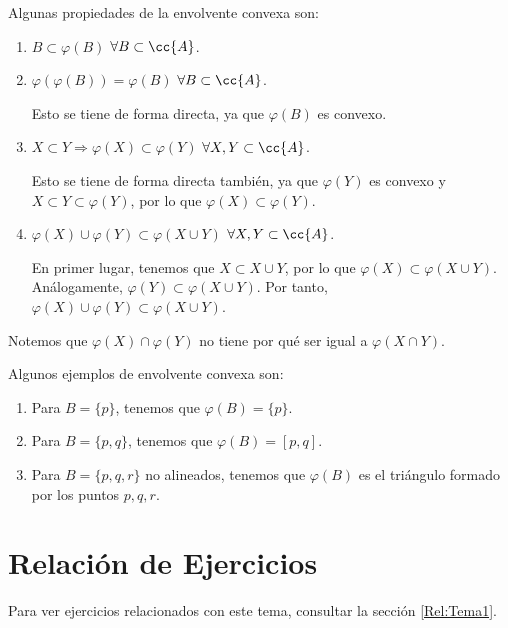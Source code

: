 Algunas propiedades de la envolvente convexa son:
\begin{enumerate}

    \item $B\subset \varphi(B)$ \qquad $\forall B\subset \cc{A}$.
    \item $\varphi(\varphi(B))=\varphi (B)$ \qquad $\forall B\subset \cc{A}$.
    
    Esto se tiene de forma directa, ya que $\varphi(B)$ es convexo.

    \item $X\subset Y \Longrightarrow \varphi(X)\subset \varphi(Y)$ \qquad $\forall X,Y\subset \cc{A}$.
    
    Esto se tiene de forma directa también, ya que $\varphi(Y)$ es convexo y $X\subset Y\subset \varphi(Y)$, por lo que $\varphi(X)\subset \varphi(Y)$.

    \item $\varphi (X)\cup \varphi (Y)\subset \varphi (X\cup Y)$ \qquad $\forall X,Y\subset \cc{A}$.
    
    En primer lugar, tenemos que $X \subset X\cup Y$, por lo que $\varphi(X)\subset \varphi(X\cup Y)$. Análogamente, $\varphi(Y)\subset \varphi(X\cup Y)$. Por tanto, $\varphi(X)\cup \varphi(Y)\subset \varphi(X\cup Y)$.
\end{enumerate}

Notemos que $\varphi(X)\cap \varphi(Y)$ no tiene por qué ser igual a $\varphi(X\cap Y)$.
\begin{ejemplo}
    Algunos ejemplos de envolvente convexa son:
    \begin{enumerate}
        \item Para $B=\{p\}$, tenemos que $\varphi(B)=\{p\}$.
        \item Para $B=\{p,q\}$, tenemos que $\varphi(B)=[p,q]$.
        \item Para $B=\{p,q,r\}$ no alineados, tenemos que $\varphi(B)$ es el triángulo formado por los puntos $p,q,r$.
    \end{enumerate}
\end{ejemplo}

\section{Relación de Ejercicios}

Para ver ejercicios relacionados con este tema, consultar la sección \ref{Rel:Tema1}.